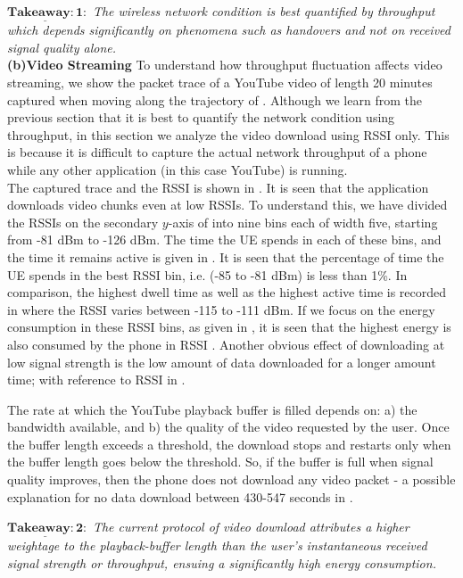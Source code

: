 $\mathrm{\mathbf{\underline{Takeaway:1}}}:$ \textit{The wireless network condition is best quantified by throughput which depends  significantly on phenomena such as handovers and not  on received signal quality alone.}\\
{\textbf{(b)Video Streaming}}\label{sec:chap03s3:vstreaming}
To understand how throughput fluctuation affects video streaming, 
we show the packet trace of a YouTube video of length 20 minutes captured when moving along the trajectory of \fig{\ref{fig:chap03s3:technology_with_traj}}.  Although we learn from the previous section that it is best to quantify the network condition using throughput, in this section we analyze the video download using \ac{RSSI} only. This is because it is difficult to capture the actual network throughput of a phone while any other application (in this case YouTube) is running.\\
\indent The  captured trace and the \ac{RSSI}  is shown in \fig{\ref{fig:chap03s3:pcap_RSSI}}. It is seen that the application downloads video chunks even at low \acp{RSSI}. To understand this, we have divided the \acp{RSSI} on the secondary $y$-axis of \fig{\ref{fig:chap03s3:pcap_RSSI}} into nine bins each of width five, starting from -81 dBm to -126 dBm. The time the \ac{UE} spends in each of these bins, and the time it remains active is given in \fig{\ref{fig:chap03s3:vid_time}}. It is seen that the percentage of time the \ac{UE} spends in the best \ac{RSSI} bin, i.e.  (-85 to -81 dBm) is less than 1\%. In comparison, the highest dwell time   as well as the highest active time is recorded in  where the \ac{RSSI} varies between -115 to -111 dBm. If we focus on the energy consumption in these \ac{RSSI} bins, as given in \fig{\ref{fig:chap03s3:vid_thpt}}, it is seen that the highest energy is also consumed by the phone in \ac{RSSI} . Another obvious effect of downloading at low signal strength is the low amount of data downloaded for a longer amount time; with reference to \ac{RSSI}  in \fig{\ref{fig:chap03s3:vid_thpt}}.


\indent The rate at which the YouTube playback buffer is filled depends on: a) the bandwidth available, and b) the quality of the video requested by the user. Once the buffer length exceeds a threshold, the download stops and restarts only when the buffer length goes below the threshold. So, if the buffer is full when signal quality improves, then the phone does not download any video packet - a possible explanation for no data download between  430-547 seconds in \fig{ \ref{fig:chap03s3:pcap_RSSI}}.


$\mathrm{\mathbf{\underline{Takeaway:2}}}:$ \textit{The current protocol of  video download attributes a higher weightage to the playback-buffer length than the user's instantaneous received signal strength or throughput, ensuing a significantly high energy consumption.}\\
